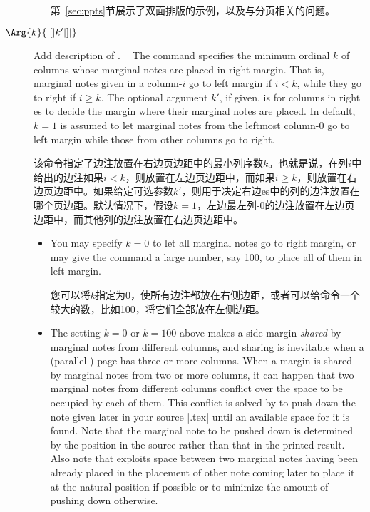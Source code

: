 \begin{description}
\begin{itemize}
第~\ref{sec:ppts}节展示了双面排版的示例，以及与\parapag{}分页相关的问题。
\end{itemize}



\item[\Midx{\!\marginparthreshold!}$\Arg{k}{|[|k'|]|}$]\mbox{}\par
{}
{Add description of .}

The command specifies the minimum ordinal $k$ of columns whose marginal
notes are placed in right margin.  That is, marginal notes given in a
column-$i$ go to left margin if $i<k$, while they go to right if $i\geq
k$.  The optional argument $k'$, if given, is for columns in right
\parapag{}es to decide the margin where their marginal notes are placed.
In default, $k=1$ is assumed to let marginal notes from the leftmost
column-0 go to left margin while those from other columns go to right.

该命令指定了边注放置在右边页边距中的最小列序数$k$。也就是说，在列$i$中给出的边注如果$i<k$，则放置在左边页边距中，而如果$i\geq k$，则放置在右边页边距中。如果给定可选参数$k'$，则用于决定右边\parapag{}es中的列的边注放置在哪个页边距。默认情况下，假设$k=1$，左边最左列-0的边注放置在左边页边距中，而其他列的边注放置在右边页边距中。
\begin{itemize}
\item
You may specify $k=0$ to let all marginal notes go to right margin, or may
give the command a large number, say 100, to place all of them in left
margin.

您可以将$k$指定为0，使所有边注都放在右侧边距，或者可以给命令一个较大的数，比如100，将它们全部放在左侧边距。

\item
The setting $k=0$ or $k=100$ above makes a side margin \emph{shared} by
marginal notes from different columns, and sharing is inevitable when a
(parallel-) page has three or more columns.  When a margin is shared by
marginal notes from two or more columns, it can happen that two marginal
notes from different columns conflict over the space to be occupied by each
of them.  This conflict is solved by \Paracol{} to push down the note
given later in your source |.tex| until an available space for it is
found.  Note that the marginal note to be pushed down is determined by the
position in the source rather than that in the printed result.  Also note
that \Paracol{} exploits space between two marginal notes having been
already placed in the placement of other note coming later to place it at
the natural position if possible or to minimize the amount of pushing down
otherwise.


\end{itemize}
\end{description}
